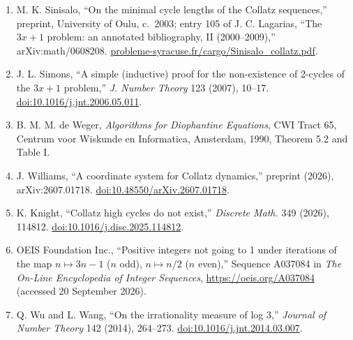 \documentclass[12pt]{article}
\begin{document}
\begin{enumerate}
  (`Syracuse') conjectures,'' \emph{Discrete Math.} 68 (1988), 293--298.
  \href{https://doi.org/10.1016/0012-365X(88)90121-5}{doi:10.1016/0012-365X(88)90121-5}.
\item
  M. K. Sinisalo, ``On the minimal cycle lengths of the Collatz
  sequences,'' preprint, University of Oulu, c.~2003; entry 105 of J. C.
  Lagarias, ``The \(3x+1\) problem: an annotated bibliography, II
  (2000--2009),'' arXiv:math/0608208.
  \href{https://www.probleme-syracuse.fr/cargo/Sinisalo_collatz.pdf}{probleme-syracuse.fr/cargo/Sinisalo\_collatz.pdf}.
\item
  J. L. Simons, ``A simple (inductive) proof for the non-existence of
  2-cycles of the \(3x+1\) problem,'' \emph{J. Number Theory} 123
  (2007), 10--17.
  \href{https://doi.org/10.1016/j.jnt.2006.05.011}{doi:10.1016/j.jnt.2006.05.011}.
\item
  B. M. M. de Weger, \emph{Algorithms for Diophantine Equations}, CWI
  Tract 65, Centrum voor Wiskunde en Informatica, Amsterdam, 1990,
  Theorem 5.2 and Table I.
\item
  J. Williams, ``A coordinate system for Collatz dynamics,'' preprint
  (2026), arXiv:2607.01718.
  \href{https://doi.org/10.48550/arXiv.2607.01718}{doi:10.48550/arXiv.2607.01718}.
\item
  K. Knight, ``Collatz high cycles do not exist,'' \emph{Discrete Math.}
  349 (2026), 114812.
  \href{https://doi.org/10.1016/j.disc.2025.114812}{doi:10.1016/j.disc.2025.114812}.
\item
  OEIS Foundation Inc., ``Positive integers not going to 1 under
  iterations of the map \(n\mapsto 3n-1\) (\(n\) odd), \(n\mapsto n/2\)
  (\(n\) even),'' Sequence A037084 in \emph{The On-Line Encyclopedia of
  Integer Sequences}, \url{https://oeis.org/A037084} (accessed 20
  September 2026).
\item
  Q. Wu and L. Wang, ``On the irrationality measure of log 3,''
  \emph{Journal of Number Theory} 142 (2014), 264--273.
  \href{https://doi.org/10.1016/j.jnt.2014.03.007}{doi:10.1016/j.jnt.2014.03.007}.
\end{enumerate}

\endgroup
\end{document}
